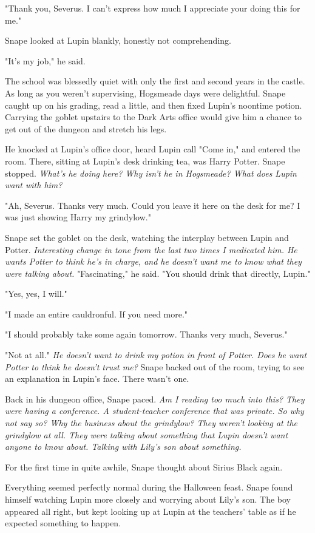 \documentclass[a4paper,11pt]{article}
\begin{document}
"Thank you, Severus. I can't express how much I appreciate your doing this for me."

Snape looked at Lupin blankly, honestly not comprehending.

"It's my job," he said.

The school was blessedly quiet with only the first and second years in the castle. As long as you weren't supervising, Hogsmeade days were delightful. Snape caught up on his grading, read a little, and then fixed Lupin's noontime potion. Carrying the goblet upstairs to the Dark Arts office would give him a chance to get out of the dungeon and stretch his legs.

He knocked at Lupin's office door, heard Lupin call "Come in," and entered the room. There, sitting at Lupin's desk drinking tea, was Harry Potter. Snape stopped. \emph{What's he doing here? Why isn't he in Hogsmeade? What does Lupin want with him?}

"Ah, Severus. Thanks very much. Could you leave it here on the desk for me? I was just showing Harry my grindylow."

Snape set the goblet on the desk, watching the interplay between Lupin and Potter. \emph{Interesting change in tone from the last two times I medicated him. He wants Potter to think he's in charge, and he doesn't want me to know what they were talking about.} "Fascinating," he said. "You should drink that directly, Lupin."

"Yes, yes, I will."

"I made an entire cauldronful. If you need more."

"I should probably take some again tomorrow. Thanks very much, Severus."

"Not at all." \emph{He doesn't want to drink my potion in front of Potter. Does he want Potter to think he doesn't trust me?} Snape backed out of the room, trying to see an explanation in Lupin's face. There wasn't one.

Back in his dungeon office, Snape paced. \emph{Am I reading too much into this? They were having a conference. A student-teacher conference that was private. So why not say so? Why the business about the grindylow? They weren't looking at the grindylow at all. They were talking about something that Lupin doesn't want anyone to know about. Talking with Lily's son about something.}

For the first time in quite awhile, Snape thought about Sirius Black again.

Everything seemed perfectly normal during the Halloween feast. Snape found himself watching Lupin more closely and worrying about Lily's son. The boy appeared all right, but kept looking up at Lupin at the teachers' table as if he expected something to happen.
\end{document}
